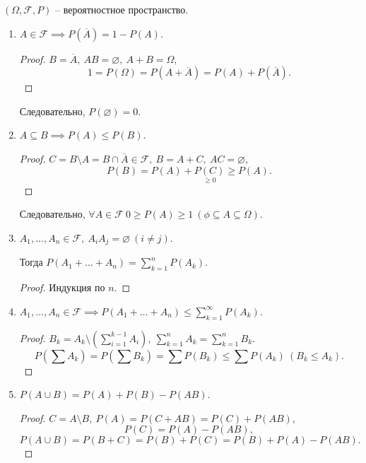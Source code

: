 \begin{theorem}
  $(\Omega,\mathcal{F},P)$ -- вероятностное пространство.
  \begin{enumerate}
    \item $A \in \mathcal{F}\implies P(\overline{A}) = 1 - P(A)$.
    \begin{proof}
      $B = \overline{A}, \ AB = \varnothing, \ A+B = \Omega,$
      \[
        1 = P(\Omega) = P(A+\overline{A}) = P(A) + P(\overline{A}).
      \]
    \end{proof}

    Следовательно, $P(\varnothing) = 0$.

    \item $A \subseteq B \implies P(A) \leqslant P(B)$.
    \begin{proof}
      $C = B \setminus A = B \cap \overline{A} \in \mathcal{F}, \ B = A + C, \ AC = \varnothing$,
      \[
        P(B) = P(A) + \underset{\geqslant 0}{P(C)} \geqslant P(A).
      \]
    \end{proof}

    Следовательно, $\forall A \in \mathcal{F} \ 0 \geqslant P(A) \geqslant 1 \ (\phi \subseteq A \subseteq \Omega)$.

    \item $A_1,\ldots,A_n \in \mathcal{F}, \ A_iA_j = \varnothing \ (i\ne j)$.

    Тогда $P(A_1 + \ldots + A_n) = \sum_{k=1}^{n}P(A_k)$.
      \begin{proof}
        Индукция по $n$.
      \end{proof}

    \item $A_1,\ldots,A_n \in \mathcal{F}\implies P(A_1 + \ldots + A_n) \leqslant \sum_{k=1}^{\infty}P(A_k)$.
    \begin{proof}
      $B_k = A_k \setminus \left(\sum_{i=1}^{k-1}A_i\right), \ \sum_{k=1}^{n}A_k = \sum_{k=1}^{n}B_k$.
      \[
        P \left(\sum A_k\right) = P(\sum B_k) = \sum P(B_k) \leqslant \sum P(A_k) \ (B_k \leqslant A_k).
      \]
    \end{proof}

    \item $P(A \cup B) = P(A) + P(B) - P(AB)$.
    \begin{proof}
      $C = A \setminus B, \ P(A) = P(C + AB) = P(C) + P(AB)$,
      \[
        P(C) = P(A) - P(AB),
      \]
      \[
        P(A \cup B) = P(B + C) = P(B) + P(C) = P(B) + P(A) - P(AB).
      \]
    \end{proof}
  \end{enumerate}
\end{theorem}

